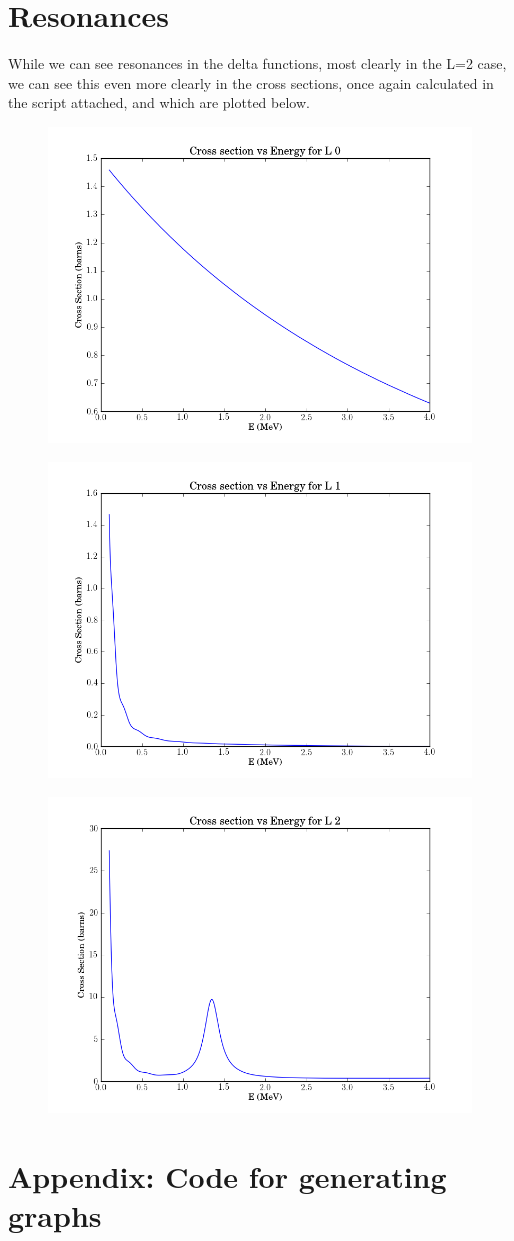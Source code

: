 \documentclass[11pt]{article} %
\begin{document}
\newpage
\section{Resonances}

While we can see resonances in the delta functions, most clearly in the L=2 case, we can see this even more clearly in the cross sections, once again calculated in the script attached, and which are plotted below.\\


\vspace{1mm}
\begin{figure}[H]
\centering
\includegraphics[width=.5\linewidth]{CrossSectionL0}
\end{figure}
\vspace{1mm}

\vspace{1mm}
\begin{figure}[H]
\centering
\includegraphics[width=.5\linewidth]{CrossSectionL1}
\end{figure}
\vspace{1mm}

\vspace{1mm}
\begin{figure}[H]
\centering
\includegraphics[width=.5\linewidth]{CrossSectionL2}
\end{figure}
\vspace{1mm}
\newpage
\section{Appendix: Code for generating graphs}

\end{document}
